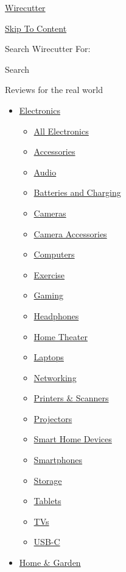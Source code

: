 \href{https://www.nytimes.com/wirecutter/}{Wirecutter}

\protect\hyperlink{main}{Skip To Content}

 Search Wirecutter For:

 Search

Reviews for the real world

\begin{itemize}
\tightlist
\item
  \href{/wirecutter/electronics/}{Electronics}

  \begin{itemize}
  \tightlist
  \item
    \href{/wirecutter/electronics/}{All Electronics}
  \item
    \href{/wirecutter/electronics/accessories/}{Accessories}
  \item
    \href{/wirecutter/electronics/audio/}{Audio}
  \item
    \href{/wirecutter/electronics/batteries/}{Batteries and Charging}
  \item
    \href{/wirecutter/electronics/cameras/}{Cameras}
  \item
    \href{/wirecutter/electronics/camera-accessories/}{Camera
    Accessories}
  \item
    \href{/wirecutter/electronics/computers/}{Computers}
  \item
    \href{/wirecutter/health-fitness/exercise/}{Exercise}
  \item
    \href{/wirecutter/electronics/gaming/}{Gaming}
  \item
    \href{/wirecutter/electronics/headphones/}{Headphones}
  \item
    \href{/wirecutter/electronics/home-theater/}{Home Theater}
  \item
    \href{/wirecutter/electronics/laptops/}{Laptops}
  \item
    \href{/wirecutter/electronics/networking/}{Networking}
  \item
    \href{/wirecutter/office/printers-scanners/}{Printers \& Scanners}
  \item
    \href{/wirecutter/electronics/projectors/}{Projectors}
  \item
    \href{/wirecutter/home-garden/smart-home/}{Smart Home Devices}
  \item
    \href{/wirecutter/electronics/smartphones/}{Smartphones}
  \item
    \href{/wirecutter/electronics/storage-devices/}{Storage}
  \item
    \href{/wirecutter/electronics/tablets/}{Tablets}
  \item
    \href{/wirecutter/electronics/tvs/}{TVs}
  \item
    \href{/wirecutter/electronics/usb-c/}{USB-C}
  \end{itemize}
\item
  \href{/wirecutter/home-garden/}{Home \& Garden}


\end{itemize}
